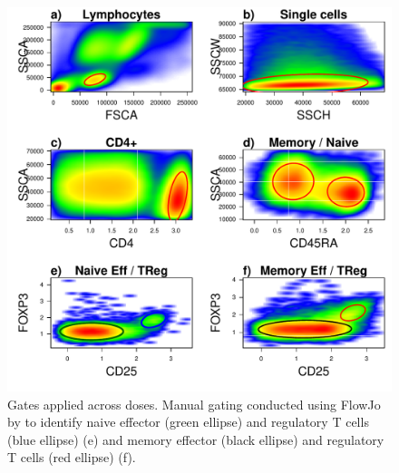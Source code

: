 \begin{figure}[h]
\centering
  \includegraphics[scale=.75]{IL2/figures/CB00366X_2012-11-07.pdf}
{Gates applied across doses.}
{
Manual gating conducted using FlowJo by  to identify
naive effector (green ellipse) and regulatory T cells (blue ellipse) (e)
and memory effector (black ellipse) and regulatory T cells (red ellipse) (f).
}
\end{figure}
